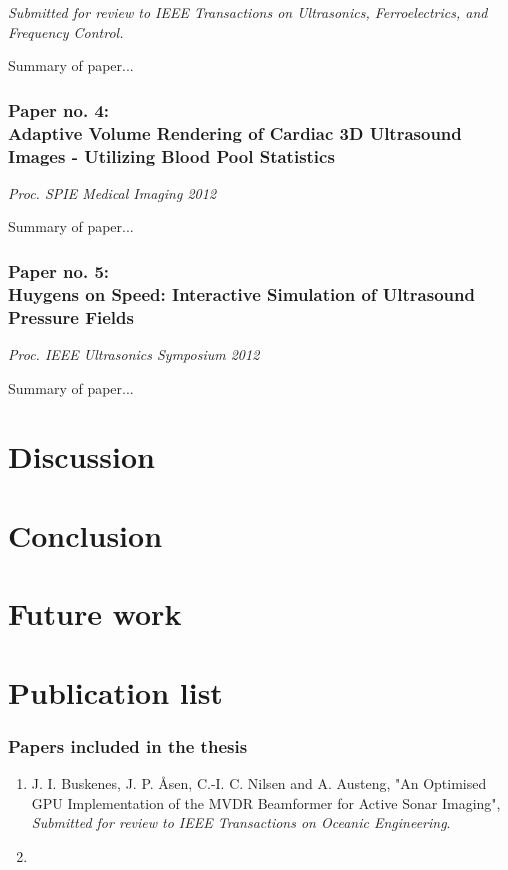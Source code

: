 {\it Submitted for review to IEEE Transactions on Ultrasonics, Ferroelectrics, and Frequency Control.}
\vspace{0.3 cm}

Summary of paper...

\subsubsection{Paper no. 4:\\
Adaptive Volume Rendering of Cardiac 3D Ultrasound Images - Utilizing Blood Pool Statistics}

{\it Proc. SPIE Medical Imaging 2012}
\vspace{0.3 cm}

Summary of paper...

\subsubsection{Paper no. 5:\\
Huygens on Speed: Interactive Simulation of Ultrasound Pressure Fields}

{\it Proc. IEEE Ultrasonics Symposium 2012}
\vspace{0.3 cm}

Summary of paper...

\section{Discussion}

\section{Conclusion}

\section{Future work}

\section{Publication list}

\subsubsection{Papers included in the thesis}
\begin{enumerate}
	\item J. I. Buskenes, J. P. \AA{}sen, C.-I. C. Nilsen and A. Austeng, "An Optimised GPU Implementation of the MVDR Beamformer for Active Sonar Imaging", {\it Submitted for review to IEEE Transactions on Oceanic Engineering}.
	\item 
\end{enumerate}  
  
